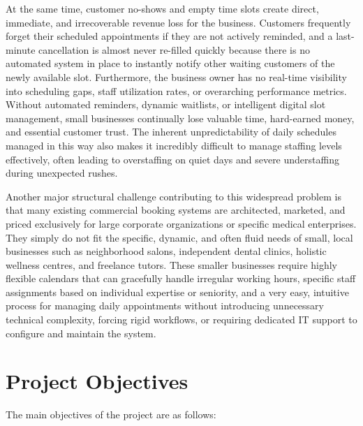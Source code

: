 At the same time, customer no-shows and empty time slots create direct, immediate, and irrecoverable revenue loss for the business. Customers frequently forget their scheduled appointments if they are not actively reminded, and a last-minute cancellation is almost never re-filled quickly because there is no automated system in place to instantly notify other waiting customers of the newly available slot. Furthermore, the business owner has no real-time visibility into scheduling gaps, staff utilization rates, or overarching performance metrics. Without automated reminders, dynamic waitlists, or intelligent digital slot management, small businesses continually lose valuable time, hard-earned money, and essential customer trust. The inherent unpredictability of daily schedules managed in this way also makes it incredibly difficult to manage staffing levels effectively, often leading to overstaffing on quiet days and severe understaffing during unexpected rushes.

Another major structural challenge contributing to this widespread problem is that many existing commercial booking systems are architected, marketed, and priced exclusively for large corporate organizations or specific medical enterprises. They simply do not fit the specific, dynamic, and often fluid needs of small, local businesses such as neighborhood salons, independent dental clinics, holistic wellness centres, and freelance tutors. These smaller businesses require highly flexible calendars that can gracefully handle irregular working hours, specific staff assignments based on individual expertise or seniority, and a very easy, intuitive process for managing daily appointments without introducing unnecessary technical complexity, forcing rigid workflows, or requiring dedicated IT support to configure and maintain the system.

\section{Project Objectives}
The main objectives of the project are as follows:

